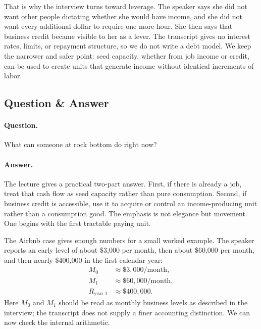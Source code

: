 That is why the interview turns toward leverage. The speaker says she did not want other people dictating whether she would have income, and she did not want every additional dollar to require one more hour. She then says that business credit became visible to her as a lever. The transcript gives no interest rates, limits, or repayment structure, so we do not write a debt model. We keep the narrower and safer point: seed capacity, whether from job income or credit, can be used to create units that generate income without identical increments of labor.

\subsection{Question \& Answer}

\paragraph{Question.} What can someone at rock bottom do right now?

\paragraph{Answer.} The lecture gives a practical two-part answer. First, if there is already a job, treat that cash flow as seed capacity rather than pure consumption. Second, if business credit is accessible, use it to acquire or control an income-producing unit rather than a consumption good. The emphasis is not elegance but movement. One begins with the first tractable paying unit.

The Airbnb case gives enough numbers for a small worked example. The speaker reports an early level of about \$3{,}000 per month, then about \$60{,}000 per month, and then nearly \$400{,}000 in the first calendar year:
\begin{align}
M_0 &\approx \$3{,}000/\text{month},\\
M_1 &\approx \$60{,}000/\text{month},\\
R_{\text{year 1}} &\approx \$400{,}000.
\end{align}
Here \(M_0\) and \(M_1\) should be read as monthly business levels as described in the interview; the transcript does not supply a finer accounting distinction. We can now check the internal arithmetic.

